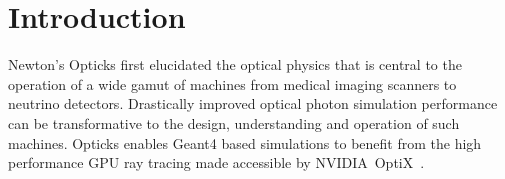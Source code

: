 \documentclass[a4paper]{jpconf}
\begin{document}
%
%
%
%
%
%
%
%

\section{Introduction}

Newton's Opticks\cite{newton} first elucidated the optical physics 
that is central to the operation of a wide gamut of machines from medical imaging 
scanners to neutrino detectors. Drastically improved optical photon simulation 
performance can be transformative to the design, understanding 
and operation of such machines. Opticks\cite{opticksURL} enables Geant4\cite{g4A}\cite{g4B}\cite{g4C}
based simulations to benefit from the high performance GPU ray tracing made accessible
by NVIDIA\textregistered\ OptiX\texttrademark\ \cite{optixPaper}\cite{optixSite}.
\end{document}
